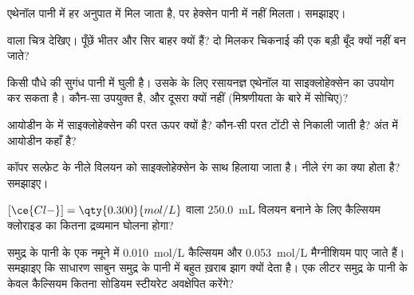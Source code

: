 \begin{exercise}[$\star\star$]\label{exo:g11:dissolution:7}
एथेनॉल  पानी में हर अनुपात में मिल जाता है, पर हेक्सेन
 पानी में नहीं मिलता। समझाइए।
\end{exercise}

\begin{exercise}[$\star\star$]\label{exo:g11:dissolution:8}
 वाला चित्र देखिए। पूँछें भीतर और सिर बाहर क्यों हैं? दो 
मिलकर चिकनाई की एक बड़ी बूँद क्यों नहीं बन जाते?
\end{exercise}

\begin{exercise}[$\star\star$]\label{exo:g11:dissolution:9}
किसी पौधे की सुगंध पानी में घुली है। उसके  के लिए रसायनज्ञ
एथेनॉल या साइक्लोहेक्सेन का उपयोग कर सकता है। कौन-सा उपयुक्त है, और दूसरा क्यों
नहीं (मिश्रणीयता के बारे में सोचिए)?
\end{exercise}

\begin{exercise}[$\star\star$]\label{exo:g11:dissolution:10}
आयोडीन के  में साइक्लोहेक्सेन की परत ऊपर क्यों है? कौन-सी
परत टोंटी से निकाली जाती है? अंत में आयोडीन कहाँ है?
\end{exercise}

\begin{exercise}[$\star\star$]\label{exo:g11:dissolution:11}
कॉपर सल्फ़ेट के नीले विलयन को साइक्लोहेक्सेन के साथ हिलाया जाता है। नीले रंग का
क्या होता है? समझाइए।
\end{exercise}

\begin{exercise}[$\star\star\star$]\label{exo:g11:dissolution:12}
$[\ce{Cl-}] = \qty{0.300}{mol/L}$ वाला \qty{250.0}{mL} विलयन बनाने के लिए
कैल्सियम क्लोराइड का कितना द्रव्यमान घोलना होगा?
\end{exercise}

\begin{exercise}[$\star\star\star$]\label{exo:g11:dissolution:13}
समुद्र के पानी के एक नमूने में \qty{0.010}{mol/L} कैल्सियम
 और \qty{0.053}{mol/L} मैग्नीशियम  पाए जाते हैं। समझाइए कि साधारण साबुन
समुद्र के पानी में बहुत ख़राब झाग क्यों देता है। एक लीटर समुद्र के पानी के केवल
कैल्सियम  कितना सोडियम स्टीयरेट अवक्षेपित करेंगे?
\end{exercise}

